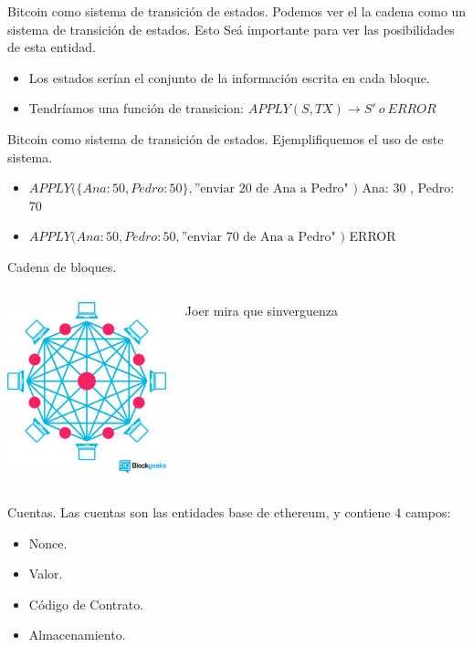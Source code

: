 \documentclass[usenames,dvipsnames]{beamer}
\begin{document}
\begin{frame}{ Bitcoin como sistema de transición de estados. }
Podemos ver el la cadena como un sistema de transición de estados. Esto Seá importante para ver las posibilidades de esta entidad.
\begin{itemize}
	\item Los estados serían el conjunto de la información escrita en cada bloque.
  	\item Tendríamos una  función de transicion: $ APPLY( S , TX ) \to S'\ o\ ERROR$
\end{itemize}
\end{frame}


\begin{frame}{ Bitcoin como sistema de transición de estados. }
Ejemplifiquemos el uso de este sistema.
\begin{itemize}
	\item $ APPLY( \{ Ana: 50 , Pedro: 50 \} , \text{''enviar 20 de Ana a Pedro" )} $
  { Ana: 30 , Pedro: 70 }
  \item  $  APPLY( { Ana: 50 , Pedro: 50 } , \text{''enviar 70 de Ana a Pedro" )} $
  ERROR
\end{itemize}
\end{frame}


\begin{frame} {Cadena de bloques.}
	  \begin{columns}

     
\includegraphics[height=5cm]{./images/blockchain.png}



Joer mira que sinverguenza

\end{columns}
\end{frame}

\begin{frame}{ Cuentas. }
	Las cuentas son las entidades base de ethereum, y contiene 4 campos:
	\begin{itemize}
	\item Nonce.
	\item Valor.
	\item Código de Contrato.
	\item Almacenamiento.
	\end{itemize}
\end{frame}
\end{document}
